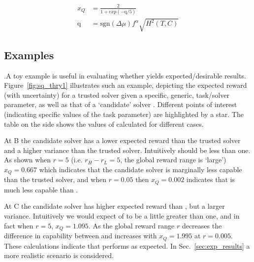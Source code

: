\begin{align}
    x_{Q} &= \frac{2}{1+exp(-\text{q}/5)}\label{eq:SQ} \\
    \text{q} &= \text{sgn}(\Delta \mu)f^{\alpha}\sqrt{H^{2}(T,C)} \label{eq:q}
\end{align}

\subsection{Examples}
.A toy example is useful in evaluating whether \xQ{} yields expected/desirable results. Figure~\ref{fig:sq_thry1} illustrates such an example, depicting the expected reward (with uncertainty) for a trusted solver \solvestar{} given a specific, generic, task/solver parameter, as well as that of a `candidate' solver \solve. Different points of interest (indicating specific values of the task parameter) are highlighted by a star. The table on the side shows the values of \xQ{} calculated for different cases.

At B the candidate solver has a lower expected reward than the trusted solver and a higher variance than the trusted solver. Intuitively \xQ{} should be less than one. As shown when $r=5$ (i.e. $r_H-r_L=5$, the global reward range is `large') $x_Q=0.667$ which indicates that the candidate solver is marginally less capable than the trusted solver, and when $r=0.05$ then $x_Q=0.002$ indicates that \solve{} is much less capable than \solvestar.

At C the candidate solver \solve{} has higher expected reward than \solvestar, but a larger variance. Intuitively we would expect \xQ{} of \solve{} to be a little greater than one, and in fact when $r=5$, $x_Q=1.095$. As the global reward range $r$ decreases the difference in capability between \solve{} and \solvestar{} increases with $x_Q=1.995$ at $r=0.005$. These calculations indicate that \xQ{} performs as expected. In Sec.~\ref{sec:exp_results} a more realistic scenario is considered. 

